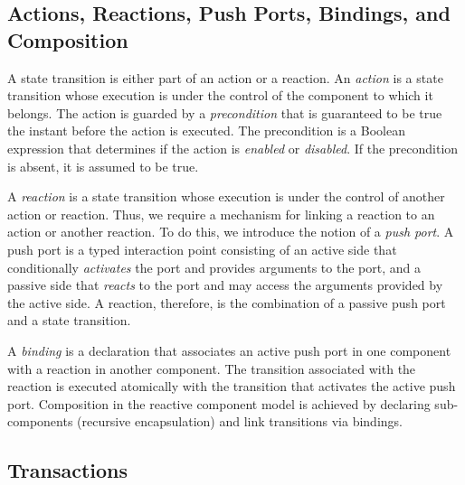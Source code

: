 \subsection{Actions, Reactions, Push Ports, Bindings, and Composition}
\label{composition}
A state transition is either part of an action or a reaction.
An \emph{action} is a state transition whose execution is under the control of the component to which it belongs.
The action is guarded by a \emph{precondition} that is guaranteed to be true the instant before the action is executed.
The precondition is a Boolean expression that determines if the action is \emph{enabled} or \emph{disabled}.
If the precondition is absent, it is assumed to be true.

A \emph{reaction} is a state transition whose execution is under the control of another action or reaction.
Thus, we require a mechanism for linking a reaction to an action or another reaction.
To do this, we introduce the notion of a \emph{push port}.
A push port is a typed interaction point consisting of an active side that conditionally \emph{activates} the port and provides arguments to the port, and a passive side that \emph{reacts} to the port and may access the arguments provided by the active side.
A reaction, therefore, is the combination of a passive push port and a state transition.

A \emph{binding} is a declaration that associates an active push port in one component with a reaction in another component.
The transition associated with the reaction is executed atomically with the transition that activates the active push port.
Composition in the reactive component model is achieved by declaring sub-components (recursive encapsulation) and link transitions via bindings.

\subsection{Transactions}

